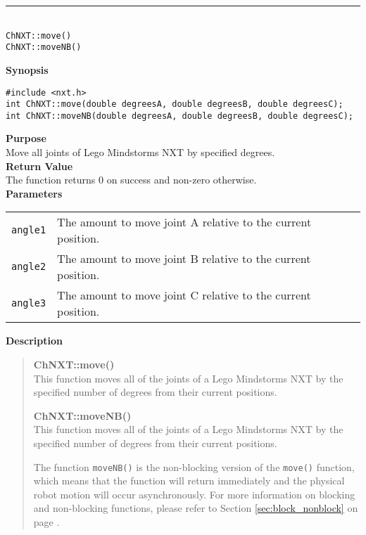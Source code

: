 \noindent
\vspace{5pt}
\rule{4.5in}{0.015in}\\
\noindent
{\LARGE \texttt{ChNXT::move()} }\\
{\LARGE \texttt{ChNXT::moveNB()} }\\


\noindent
{\bf Synopsis}
\begin{lstlisting}
#include <nxt.h>
int ChNXT::move(double degreesA, double degreesB, double degreesC);
int ChNXT::moveNB(double degreesA, double degreesB, double degreesC);
\end{lstlisting}

\noindent
{\bf Purpose}\\
Move all joints of Lego Mindstorms NXT by specified degrees.\\

\noindent
{\bf Return Value}\\
The function returns 0 on success and non-zero otherwise.\\

\noindent
{\bf Parameters}\\
\vspace{-0.1in}
\begin{description}
\item               
\begin{tabular}{p{15 mm}p{125 mm}}
\texttt{angle1} & The amount to move joint A relative to the current position. \\
\texttt{angle2} & The amount to move joint B relative to the current position. \\
\texttt{angle3} & The amount to move joint C relative to the current position. \\
\end{tabular}
\end{description}

\noindent
{\bf Description}\\
\vspace{-12pt}
\begin{quote}
{\bf ChNXT::move()}\\
This function moves all of the joints of a Lego Mindstorms NXT by 
the specified number of degrees from their current positions. 

\noindent
{\bf ChNXT::moveNB()}\\
This function moves all of the joints of a Lego Mindstorms NXT by 
the specified number of degrees from their current positions. 

The function \texttt{moveNB()} is the non-blocking version of the 
\texttt{move()} function, which means that the function will 
return immediately and the physical robot motion will occur 
asynchronously. For more information on blocking and non-blocking 
functions, please refer to Section \ref{sec:block_nonblock} on page 
\pageref{sec:block_nonblock}.\\
\end{quote}

